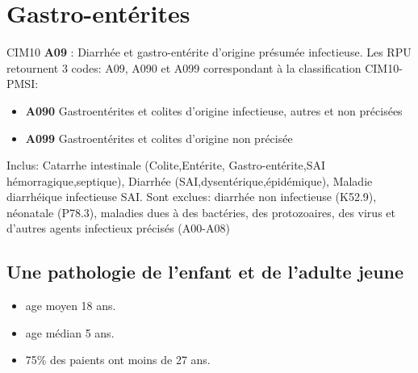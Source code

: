 \documentclass[12pt,english,french,twoside]{book}\usepackage[]{graphicx}\usepackage[]{color}
\begin{document}
\section{Gastro-entérites}

CIM10 \textbf{A09} : Diarrhée et gastro-entérite d'origine présumée infectieuse. Les RPU retournent 3 codes: A09, A090 et A099 correspondant à la classification CIM10-PMSI:
\begin{itemize}
  \item \textbf{A090} Gastroentérites et colites d’origine infectieuse, autres et non précisées
  \item \textbf{A099} Gastroentérites et colites d’origine non précisée
\end{itemize}

Inclus: Catarrhe intestinale (Colite,Entérite, Gastro-entérite,SAI hémorragique,septique), Diarrhée (SAI,dysentérique,épidémique), Maladie diarrhéique infectieuse SAI.
Sont exclues: diarrhée non infectieuse (K52.9), néonatale (P78.3), maladies dues à des bactéries, des protozoaires, des virus et d'autres agents infectieux précisés (A00-A08) 



\subsection*{Une pathologie de l'enfant et de l'adulte jeune}


\begin{itemize}
  \item age moyen 18 ans.
  \item age médian 5 ans.
  \item 75\% des paients ont moins de 27 ans.
\end{itemize}
\end{document}
